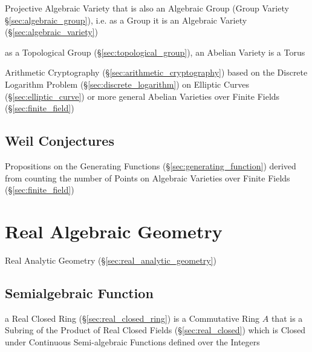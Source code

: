Projective Algebraic Variety that is also an Algebraic Group (Group Variety
\S\ref{sec:algebraic_group}), i.e. as a Group it is an Algebraic Variety
(\S\ref{sec:algebraic_variety})

as a Topological Group (\S\ref{sec:topological_group}), an Abelian Variety is a
Torus %

\fist Arithmetic Cryptography (\S\ref{sec:arithmetic_cryptography}) based on
the Discrete Logarithm Problem (\S\ref{sec:discrete_logarithm}) on Elliptic
Curves (\S\ref{sec:elliptic_curve}) or more general Abelian Varieties over
Finite Fields (\S\ref{sec:finite_field})



\subsection{Weil Conjectures}\label{sec:weil_conjectures}

Propositions on the Generating Functions (\S\ref{sec:generating_function})
derived from counting the number of Points on Algebraic Varieties over Finite
Fields (\S\ref{sec:finite_field})



\section{Real Algebraic Geometry}\label{sec:real_algebraic_geometry}

Real Analytic Geometry (\S\ref{sec:real_analytic_geometry})



\subsection{Semialgebraic Function}\label{sec:semialgebraic_function}

a Real Closed Ring (\S\ref{sec:real_closed_ring}) is a Commutative Ring $A$
that is a Subring of the Product of Real Closed Fields
(\S\ref{sec:real_closed}) which is Closed under Continuous Semi-algebraic
Functions defined over the Integers

